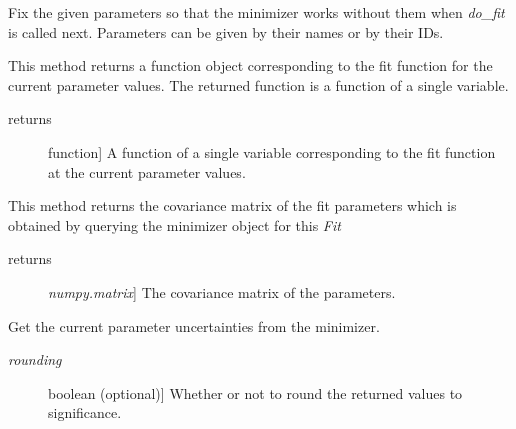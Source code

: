 \documentclass[a4paper,10pt,english]{sphinxmanual}
\begin{document}
\begin{fulllineitems}
\begin{fulllineitems}
\end{fulllineitems}


\begin{fulllineitems}
\label{index:kafe.fit.Fit.fix_parameters}
Fix the given parameters so that the minimizer works without them
when \emph{do\_fit} is called next. Parameters can be given by their names
or by their IDs.

\end{fulllineitems}


\begin{fulllineitems}
\label{index:kafe.fit.Fit.get_current_fit_function}
This method returns a function object corresponding to the fit function
for the current parameter values. The returned function is a function
of a single variable.
\begin{description}
\item[{returns}] \leavevmode{[}function{]}
A function of a single variable corresponding to the fit function
at the current parameter values.

\end{description}

\end{fulllineitems}


\begin{fulllineitems}
\label{index:kafe.fit.Fit.get_error_matrix}
This method returns the covariance matrix of the fit parameters which
is obtained by querying the minimizer object for this \emph{Fit}
\begin{description}
\item[{returns}] \leavevmode{[}\emph{numpy.matrix}{]}
The covariance matrix of the parameters.

\end{description}

\end{fulllineitems}


\begin{fulllineitems}
\label{index:kafe.fit.Fit.get_parameter_errors}
Get the current parameter uncertainties from the minimizer.
\begin{description}
\item[{\emph{rounding}}] \leavevmode{[}boolean (optional){]}
Whether or not to round the returned values to significance.


\end{description}
\end{fulllineitems}
\end{fulllineitems}
\end{document}
